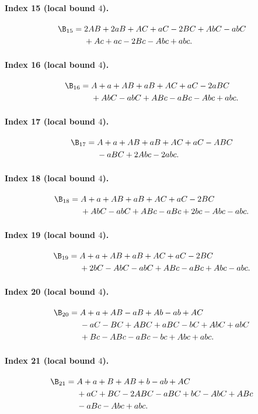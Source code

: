 \paragraph{Index 15 (local bound $4$).}
\begin{align*}
\B_{15}={}&2AB +2aB +AC +aC -2BC +AbC -abC\\
&{}+Ac +ac -2Bc -Abc +abc.
\end{align*}
\paragraph{Index 16 (local bound $4$).}
\begin{align*}
\B_{16}={}&A +a +AB +aB +AC +aC -2aBC\\
&{}+AbC -abC +ABc -aBc -Abc +abc.
\end{align*}
\paragraph{Index 17 (local bound $4$).}
\begin{align*}
\B_{17}={}&A +a +AB +aB +AC +aC -ABC\\
&{}-aBC +2Abc -2abc.
\end{align*}
\paragraph{Index 18 (local bound $4$).}
\begin{align*}
\B_{18}={}&A +a +AB +aB +AC +aC -2BC\\
&{}+AbC -abC +ABc -aBc +2bc -Abc -abc.
\end{align*}
\paragraph{Index 19 (local bound $4$).}
\begin{align*}
\B_{19}={}&A +a +AB +aB +AC +aC -2BC\\
&{}+2bC -AbC -abC +ABc -aBc +Abc -abc.
\end{align*}
\paragraph{Index 20 (local bound $4$).}
\begin{align*}
\B_{20}={}&A +a +AB -aB +Ab -ab +AC\\
&{}-aC -BC +ABC +aBC -bC +AbC +abC\\
&{}+Bc -ABc -aBc -bc +Abc +abc.
\end{align*}
\paragraph{Index 21 (local bound $4$).}
\begin{align*}
\B_{21}={}&A +a +B +AB +b -ab +AC\\
&{}+aC +BC -2ABC -aBC +bC -AbC +ABc\\
&{}-aBc -Abc +abc.
\end{align*}
